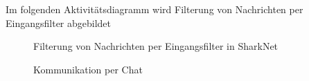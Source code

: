 \documentclass[german, 12pt]{book}
\begin{document}
\newpage

Im folgenden Aktivitätsdiagramm wird Filterung von Nachrichten per Eingangsfilter abgebildet
\begin{figure}[H]
	\centering
	\hspace*{1cm}
	\caption{Filterung von Nachrichten per Eingangsfilter in SharkNet}
	\label{fig:entryFilter}
\end{figure}

\newpage

\begin{figure}[H]
	\centering
	\hspace*{1cm}
	\caption{Kommunikation per Chat}
	\label{fig:communication}
\end{figure}

\newpage
\end{document}
